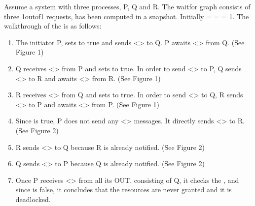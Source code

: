 \documentclass[letterpaper,10pt,english]{sphinxmanual}
\begin{document}
\sphinxAtStartPar
Assume a system with three processes, P, Q and R. The wait\sphinxhyphen{}for graph consists of three 1\sphinxhyphen{}out\sphinxhyphen{}of\sphinxhyphen{}1 requests, has been computed in a snapshot. Initially  =  =  = 1.
The walkthrough of the {\hyperref[\detokenize{docs/BrachaToueg/algorithm:brachatouegdeadlockdetectionalgorithm}]{}} is as follows:
\begin{enumerate}
%
\item {} 
\sphinxAtStartPar
The initiator P, sets  to true and sends \textless{}\textgreater{} to Q. P awaits \textless{}\textgreater{} from Q. (See Figure 1)

\item {} 
\sphinxAtStartPar
Q receives \textless{}\textgreater{} from P and sets  to true. In order to send \textless{}\textgreater{} to P, Q sends \textless{}\textgreater{} to R and awaits \textless{}\textgreater{} from R. (See Figure 1)

\item {} 
\sphinxAtStartPar
R receives \textless{}\textgreater{} from Q and sets  to true. In order to send \textless{}\textgreater{} to Q, R sends \textless{}\textgreater{} to P and awaits \textless{}\textgreater{} from P. (See Figure 1)

\item {} 
\sphinxAtStartPar
Since  is true, P does not send any \textless{}\textgreater{} messages. It directly sends \textless{}\textgreater{} to R. (See Figure 2)

\item {} 
\sphinxAtStartPar
R sends \textless{}\textgreater{} to Q because R is already notified. (See Figure 2)

\item {} 
\sphinxAtStartPar
Q sends \textless{}\textgreater{} to P because Q is already notified. (See Figure 2)

\item {} 
\sphinxAtStartPar
Once P receives \textless{}\textgreater{} from all its OUT, consisting of Q, it checks the , and since  is false, it concludes that the resources are never granted and it is deadlocked.

\end{enumerate}
\end{document}
